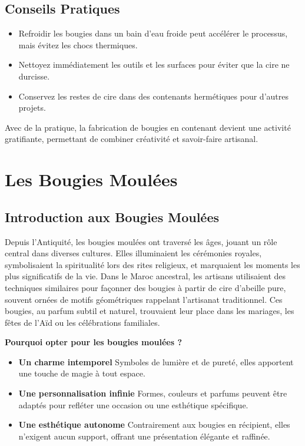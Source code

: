 \documentclass[11pt,fleqn,onecolumn,oneside]{book}
\begin{document}
\section{Conseils Pratiques}
\begin{itemize}
    \item Refroidir les bougies dans un bain d’eau froide peut accélérer le processus, mais évitez les chocs thermiques.
    \item Nettoyez immédiatement les outils et les surfaces pour éviter que la cire ne durcisse.
    \item Conservez les restes de cire dans des contenants hermétiques pour d’autres projets.
\end{itemize}

\begin{remark}
Avec de la pratique, la fabrication de bougies en contenant devient une activité gratifiante, permettant de combiner créativité et savoir-faire artisanal.
\end{remark}

\chapter{Les Bougies Moulées}

\section{Introduction aux Bougies Moulées}


Depuis l’Antiquité, les bougies moulées ont traversé les âges, jouant un rôle central dans diverses cultures. Elles illuminaient les cérémonies royales, symbolisaient la spiritualité lors des rites religieux, et marquaient les moments les plus significatifs de la vie. Dans le Maroc ancestral, les artisans utilisaient des techniques similaires pour façonner des bougies à partir de cire d’abeille pure, souvent ornées de motifs géométriques rappelant l'artisanat traditionnel. Ces bougies, au parfum subtil et naturel, trouvaient leur place dans les mariages, les fêtes de l’Aïd ou les célébrations familiales.

\begin{definition}
\textbf{Pourquoi opter pour les bougies moulées ?}
\begin{itemize}
    \item \textbf{Un charme intemporel} Symboles de lumière et de pureté, elles apportent une touche de magie à tout espace.
    \item \textbf{Une personnalisation infinie} Formes, couleurs et parfums peuvent être adaptés pour refléter une occasion ou une esthétique spécifique.
    \item \textbf{Une esthétique autonome} Contrairement aux bougies en récipient, elles n’exigent aucun support, offrant une présentation élégante et raffinée.
\end{itemize}
\end{definition}
\end{document}

